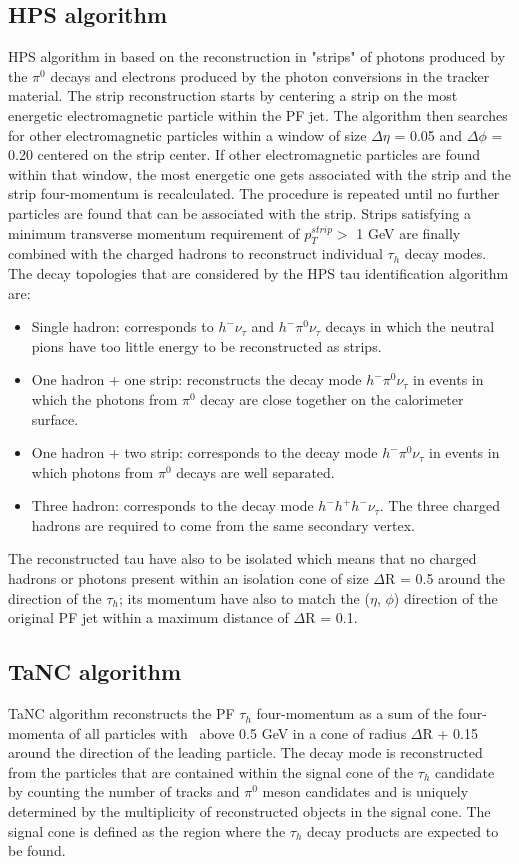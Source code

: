 \subsection{HPS algorithm}
HPS algorithm in based on the reconstruction in "strips" of photons produced by the $\pi^0$ decays and electrons produced by the photon conversions in the tracker material. The strip reconstruction starts by centering a strip on the most energetic electromagnetic particle within the PF jet. The algorithm then searches for other electromagnetic particles within a window of size $\Delta\eta$ = 0.05 and $\Delta\phi$ = 0.20 centered on the strip center. If other electromagnetic particles are found within that window, the most energetic one gets associated with the strip and the strip four-momentum is recalculated. The procedure is repeated until no further particles are found that can be associated with the strip. Strips satisfying a minimum transverse momentum requirement of $p_T^{strip} >$ 1 GeV are finally combined with the charged hadrons to reconstruct individual $\tau_h$ decay modes.\\
The decay topologies that are considered by the HPS tau identification algorithm are:
\begin{itemize}
\item Single hadron: corresponds to $h^-\nu_\tau$ and $h^-\pi^0\nu_\tau$ decays in which the neutral pions have too little energy to be reconstructed as strips.
\item One hadron + one strip: reconstructs the decay mode $h^-\pi^0\nu_\tau$ in events in which the photons from $\pi^0$ decay are close together on the calorimeter surface.
\item One hadron + two strip: corresponds to the decay mode $h^-\pi^0\nu_\tau$ in events in which photons from $\pi^0$ decays are well separated.
\item Three hadron: corresponds to the decay mode $h^-h^+h^-\nu_\tau$. The three charged hadrons are required to come from the same secondary vertex.
\end{itemize}
The reconstructed tau have also to be isolated which means that no charged hadrons or photons present within an isolation cone of size $\Delta$R = 0.5 around the direction of the $\tau_h$; its momentum have also to match the ($\eta$, $\phi$) direction of the original PF jet within a maximum distance of $\Delta$R = 0.1. 
\subsection{TaNC algorithm}
TaNC algorithm reconstructs the PF $\tau_h$ four-momentum as a sum of the four-momenta of all particles with \pt~above 0.5 GeV in a cone of radius $\Delta$R + 0.15 around the direction of the leading particle. The decay mode is reconstructed from the particles that are contained within the signal cone of the $\tau_h$ candidate by counting the number of tracks and $\pi^0$ meson candidates and is uniquely determined by the multiplicity of reconstructed objects in the signal cone. The signal cone is defined as the region where the $\tau_h$ decay products are expected to be found. 

